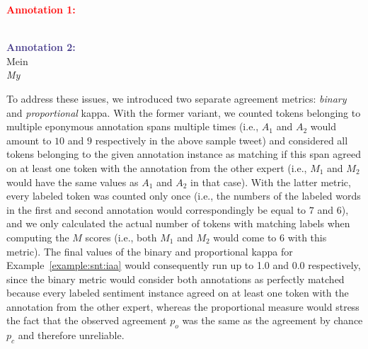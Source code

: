 {
\renewcommand{\thesection}{\arabic{section}}
\begin{example}\label{example:snt:iaa}
\upshape \textup{\textcolor{red}{\bfseries Annotation 1:}}\\
\\

\noindent\textup{\textcolor{darkslateblue}{\bfseries Annotation 2:}}\\
Mein \\
\itshape My \upshape{}
\end{example}
}

To address these issues, we introduced two separate agreement metrics:
\emph{binary} and \emph{proportional} kappa.  With the former variant,
we counted tokens belonging to multiple eponymous annotation spans
multiple times (i.e., $A_1$ and $A_2$ would amount to $10$ and $9$
respectively in the above sample tweet) and considered all tokens
belonging to the given annotation instance as matching if this span
agreed on at least one token with the annotation from the other expert
(i.e., $M_1$ and $M_2$ would have the same values as $A_1$ and $A_2$
in that case).  With the latter metric, every labeled token was
counted only once (i.e., the numbers of the labeled words in the first
and second annotation would correspondingly be equal to $7$ and $6$),
and we only calculated the actual number of tokens with matching
labels when computing the $M$ scores (i.e., both $M_1$ and $M_2$ would
come to $6$ with this metric).  The final values of the binary and
proportional kappa for Example~\ref{example:snt:iaa} would
consequently run up to 1.0 and 0.0 respectively, since the binary
metric would consider both annotations as perfectly matched because
every labeled sentiment instance agreed on at least one token with the
annotation from the other expert, whereas the proportional measure
would stress the fact that the observed agreement $p_o$ was the same
as the agreement by chance $p_c$ and therefore unreliable.

